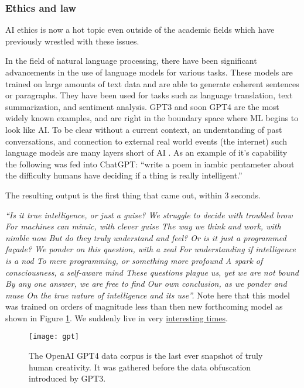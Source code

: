 \subsubsection{Ethics and law}
AI ethics is now a hot topic even outside of the academic fields which have previously wrestled with these issues.\par
In the field of natural language processing, there have been significant advancements in the use of language models for various tasks. These models are trained on large amounts of text data and are able to generate coherent sentences or paragraphs. They have been used for tasks such as language translation, text summarization, and sentiment analysis. GPT3 and soon GPT4 are the most widely known examples, and are right in the boundary space where ML begins to look like AI. To be clear without a current context, an understanding of past conversations, and connection to external real world events (the internet) such language models are many layers short of AI \cite{elkins2020can, marcus2020gpt}. As an example of it's capability the following was fed into ChatGPT: ``write a poem in iambic pentameter about the difficulty humans have deciding if a thing is really intelligent.''\par
The resulting output is the first thing that came out, within 3 seconds.\par
\textit{``Is it true intelligence, or just a guise?
We struggle to decide with troubled brow
For machines can mimic, with clever guise
The way we think and work, with nimble now
But do they truly understand and feel?
Or is it just a programmed façade?
We ponder on this question, with a zeal
For understanding if intelligence is a nod
To mere programming, or something more profound
A spark of consciousness, a self-aware mind
These questions plague us, yet we are not bound
By any one answer, we are free to find
Our own conclusion, as we ponder and muse
On the true nature of intelligence and its use''.}
Note here that this model was trained on orders of magnitude less than then new forthcoming model as shown in Figure \ref{fig:gpt}. We suddenly live in very \href{https://quoteinvestigator.com/2015/12/18/live/}{interesting times}.\par
\begin{figure}[ht]\centering 	\texttt{[image: gpt]}
	\caption{The OpenAI GPT4 data corpus is the last ever snapshot of truly human creativity. It was gathered before the data obfuscation introduced by GPT3.}
	\label{fig:gpt}
\end{figure}

